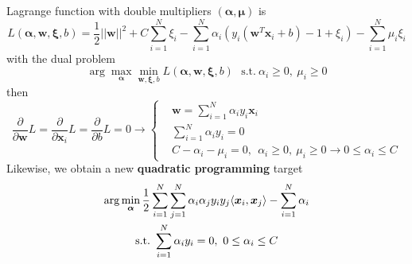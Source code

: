 \documentclass[12pt]{article}
\begin{document}
Lagrange function with double multipliers $(\bm{\alpha}, \bm{\mu})$ is
\begin{equation}
    L(\bm{\alpha}, \bm{w}, \bm{\xi}, b) = \frac{1}{2}||\bm{w}||^2 + C\sum_{i=1}^N \xi_i - \sum_{i=1}^N \alpha_i \left( y_i(\bm{w}^T\bm{x}_i + b) - 1 + \xi_i \right) - \sum_{i=1}^N \mu_i \xi_i
\end{equation}
with the dual problem
\begin{equation}
    \arg \max_{\bm{\alpha}} \min_{\bm{w},\bm{\xi},b}L(\bm{\alpha}, \bm{w}, \bm{\xi}, b)~~~\text{s.t.}~\alpha_i \geq0,~\mu_i \geq 0
\end{equation}
then
\begin{equation}
    \frac{\partial}{\partial \bm{w}} L = \frac{\partial}{\partial \bm{x}_i} L = \frac{\partial}{\partial b} L = 0 \longrightarrow
\left\{ \begin{aligned}
    &\bm{w} = \sum_{i=1}^N \alpha_i y_i \bm{x}_i \\
    &\sum_{i=1}^N \alpha_i y_i = 0\\
    &C - \alpha_i - \mu_i = 0,~~\alpha_i \geq 0,~\mu_i \geq 0 \rightarrow 0 \leq \alpha_i \leq C
\end{aligned}
\right.
\end{equation}
Likewise, we obtain a new \textbf{quadratic programming} target
\begin{gather}
    \arg \min_{\bm{\alpha}} \frac{1}{2}\sum_{i=1}^N \sum_{j=1}^N \alpha_i \alpha_j y_i y_j \langle \bm{x}_i, \bm{x}_j \rangle - \sum_{i=1}^N \alpha_i  \notag \\ \text{s.t.}~\sum_{i=1}^N \alpha_i y_i = 0,~0 \leq \alpha_i \leq C
\end{gather}
\end{document}
